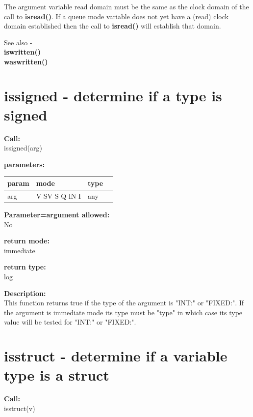         The argument variable read domain must be the same as the clock domain
        of the call to {\bf isread()}. If a queue mode variable does
        not yet have a (read) clock domain established then the call to
        {\bf isread()} will establish that domain.
        
        See also - \\
        {\bf iswritten()}  \\
        {\bf waswritten()} 


    \section{issigned - determine if a type is signed}\label{sec:ifissigned}
        
        {\bf Call:} \\
        issigned(arg)
        
        {\bf parameters:} \\
        \begin{tabular}{| l | l | l | l |}
        \hline
        param  & mode & type & \\
        \hline \hline
        arg  & V SV S Q IN I & any &   \\ \hline
        \end{tabular}
        
        {\bf Parameter=argument allowed:} \\
        No
        
        {\bf return mode:} \\
        immediate

        {\bf return type:} \\
        log
        
        {\bf Description:} \\
        This function returns true if the type of the argument is
        "INT:" or "FIXED:". If the argument is immediate mode its type
        must be "type" in which case its type value will be tested
        for "INT:" or "FIXED:".


    \section{isstruct - determine if a variable type is a struct}\label{sec:ifisstruct}
        
        {\bf Call:} \\
        isstruct(v)
        
